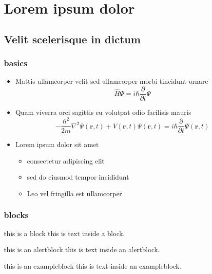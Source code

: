 \section{Lorem ipsum dolor}
\subsection{Velit scelerisque in dictum}
\begin{frame}
\frametitle{basics}

\begin{itemize}
    \item<+-|alert@+> Mattis ullamcorper velit sed ullamcorper morbi tincidunt ornare 
    \begin{equation*}
        \hat H \Psi=i \hbar \frac{\partial}{\partial t}\Psi
    \end{equation*}

    \item<+-|alert@+> Quam viverra orci sagittis eu volutpat odio facilisis mauris
    \begin{equation*}
        - \frac{\hbar^2}{2m}\nabla^2 \Psi(\mathbf{r},t)+V(\mathbf{r},t)\Psi(\mathbf{r},t) =i\hbar\frac{\partial}{\partial t}\Psi(\mathbf{r},t)
    \end{equation*}

    \item<+-|alert@+> Lorem ipsum dolor sit amet
    \begin{itemize}
        \item<+-|alert@+> consectetur adipiscing elit
        \item<+-|alert@+> sed do eiusmod tempor incididunt
        \item<+-|alert@+> Leo vel fringilla est ullamcorper
    \end{itemize}
\end{itemize}


\end{frame}
\begin{frame}
\frametitle{blocks}
    \begin{block}{this is a block}
        this is text inside a block.
    \end{block}

    \begin{alertblock}{this is an alertblock}
        this is text inside an alertblock.
    \end{alertblock}

    \begin{exampleblock}{this is an exampleblock\footnotemark}
        this is text inside an exampleblock.
    \end{exampleblock}

\end{frame}
